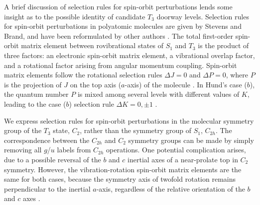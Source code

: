 
A brief discussion of selection rules for spin-orbit perturbations
lends some insight as to the possible identity of candidate $T_3$
doorway levels.  Selection rules for spin-orbit perturbations in
polyatomic molecules are given by Stevens and Brand, and have been
reformulated by other authors \cite{stevens73, howard78, dupre84}.
The total first-order spin-orbit matrix element between rovibrational
states of $S_1$ and $T_3$ is the product of three factors: an
electronic spin-orbit matrix element, a vibrational overlap factor,
and a rotational factor arising from angular momentum coupling.
Spin-orbit matrix elements follow the rotational selection rules
$\Delta J = 0$ and $\Delta P = 0$, where $P$ is the projection of $J$
on the top axis ($a$-axis) of the molecule \cite{hougen64}.  In Hund's
case ($b$), the quantum number $P$ is mixed among several levels with
different values of $K$, leading to the case ($b$) selection rule
$\Delta K = 0, \pm 1$ \cite{hougen64, stevens73}.

We express selection rules for spin-orbit perturbations in the
molecular symmetry group of the $T_3$ state, $C_2$, rather than the
symmetry group of $S_1$, $C_{2h}$.  The correspondence between the
$C_{2h}$ and $C_{2}$ symmetry groups can be made by simply removing
all $g$/$u$ labels from $C_{2h}$ operations.  One potential
complication arises, due to a possible reversal of the $b$ and $c$
inertial axes of a near-prolate top in $C_2$ symmetry.  However, the
vibration-rotation spin-orbit matrix elements are the same for both
cases, because the symmetry axis of twofold rotation remains
perpendicular to the inertial $a$-axis, regardless of the relative
orientation of the $b$ and $c$ axes \cite{hougen64}.

